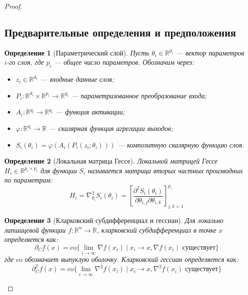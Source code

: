 \documentclass[a4paper,12pt]{article}
\newtheorem{definition}{Определение}
\begin{document}
    \begin{proof}
    
    \subsection*{Предварительные определения и предположения}
    
    \begin{definition}[Параметрический слой]
    Пусть $\theta_i \in \mathbb{R}^{p_i}$ — вектор параметров $i$-го слоя, где $p_i$ — общее число параметров. Обозначим через:
    \begin{itemize}
    \item $z_i \in \mathbb{R}^{d_i}$ — входные данные слоя;
    \item $P_i: \mathbb{R}^{d_i} \times \mathbb{R}^{p_i} \rightarrow \mathbb{R}^{q_i}$ — параметризованное преобразование входа;
    \item $A_i: \mathbb{R}^{q_i} \rightarrow \mathbb{R}^{q_i}$ — функция активации;
    \item $\varphi: \mathbb{R}^{q_i} \rightarrow \mathbb{R}$ — скалярная функция агрегации выходов;
    \item $S_i(\theta_i) = \varphi(A_i(P_i(z_i; \theta_i)))$ — композитную скалярную функцию слоя.
    \end{itemize}
    \end{definition}
    
    \begin{definition}[Локальная матрица Гессе]
    Локальной матрицей Гессе $H_i \in \mathbb{R}^{p_i \times p_i}$ для функции $S_i$ называется матрица вторых частных производных по параметрам:
    \begin{equation}
    H_i = \nabla_{\theta_i}^2 S_i(\theta_i) = \left[ \frac{\partial^2 S_i(\theta_i)}{\partial \theta_{i,j} \partial \theta_{i,k}} \right]_{j,k=1}^{p_i}
    \end{equation}
    \end{definition}
    
    \begin{definition}[Кларковский субдифференциал и гессиан]
    Для локально липшицевой функции $f: \mathbb{R}^n \rightarrow \mathbb{R}$, кларковский субдифференциал в точке $x$ определяется как:
    \begin{equation}
    \partial_C f(x) = \text{co}\{\lim_{i\to\infty} \nabla f(x_i) \mid x_i \to x, \nabla f(x_i) \text{ существует}\}
    \end{equation}
    где $\text{co}$ обозначает выпуклую оболочку. Кларковский гессиан определяется как:
    \begin{equation}
    \partial_C^2 f(x) = \text{co}\{\lim_{i\to\infty} \nabla^2 f(x_i) \mid x_i \to x, \nabla^2 f(x_i) \text{ существует}\}
    \end{equation}
    \end{definition}
    

\end{proof}
\end{document}
